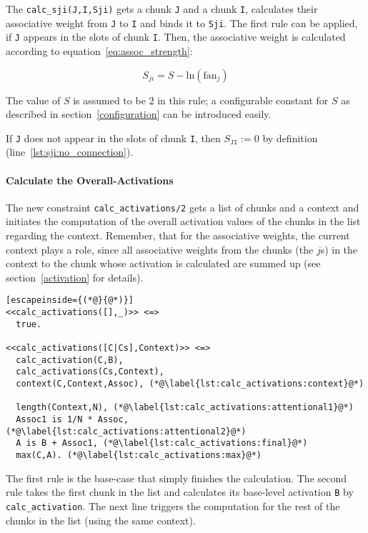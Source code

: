 The \lstinline|calc_sji(J,I,Sji)| gets a chunk \lstinline|J| and a chunk \lstinline|I|, calculates their associative weight from \lstinline|J| to \lstinline|I| and binds it to \lstinline|Sji|. The first rule can be applied, if \lstinline|J| appears in the slots of chunk \lstinline|I|. Then, the associative weight is calculated according to equation~\eqref{eq:assoc_strength}:

\begin{equation*}
S_{ji} = S - \mathrm{ln}(\mathrm{fan}_j) 
\end{equation*}

The value of $S$ is assumed to be $2$ in this rule; a configurable constant for $S$ as described in section~\ref{configuration} can be introduced easily.

If \lstinline|J| does not appear in the slots of chunk \lstinline|I|, then $S_{\mathtt{JI}} := 0$ by definition (line~\ref{lst:sji:no_connection}).

\paragraph{Calculate the Overall-Activations}

The new constraint \lstinline|calc_activations/2| gets a list of chunks and a context and initiates the computation of the overall activation values of the chunks in the list regarding the context. Remember, that for the associative weights, the current context plays a role, since all associative weights from the chunks (the $j$s) in the context to the chunk whose activation is calculated are summed up (see section~\ref{activation} for details).

\begin{lstlisting}[escapeinside={(*@}{@*)}]
<<calc_activations([],_)>> <=>
  true.
  
<<calc_activations([C|Cs],Context)>> <=> 
  calc_activation(C,B), 
  calc_activations(Cs,Context), 
  context(C,Context,Assoc), (*@\label{lst:calc_activations:context}@*)
  
  length(Context,N), (*@\label{lst:calc_activations:attentional1}@*)
  Assoc1 is 1/N * Assoc, (*@\label{lst:calc_activations:attentional2}@*)
  A is B + Assoc1, (*@\label{lst:calc_activations:final}@*)
  max(C,A). (*@\label{lst:calc_activations:max}@*)
\end{lstlisting}

The first rule is the base-case that simply finishes the calculation. The second rule takes the first chunk in the list and calculates its base-level activation \lstinline|B| by \lstinline|calc_activation|. The next line triggers the computation for the rest of the chunks in the list (using the same context).

